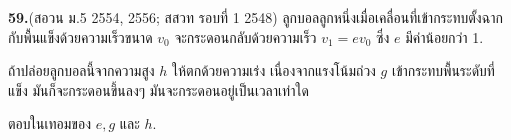 \par\noindent\textbf{59.}\quad (สอวน ม.5 2554, 2556; สสวท รอบที่ 1 2548) ลูกบอลลูกหนึ่งเมื่อเคลื่อนที่เข้ากระทบตั้งฉากกับพื้นแข็งด้วยความเร็วขนาด $v_0$ จะกระดอนกลับด้วยความเร็ว $v_1=e v_0$ ซึ่ง $e$ มีค่าน้อยกว่า 1.

ถ้าปล่อยลูกบอลนี้จากความสูง $h$ ให้ตกด้วยความเร่ง เนื่องจากแรงโน้มถ่วง $g$ เข้ากระทบพื้นระดับที่แข็ง มันก็จะกระดอนขึ้นลงๆ มันจะกระดอนอยู่เป็นเวลาเท่าใด

ตอบในเทอมของ $e,g$ และ $h$.\par\medskip
